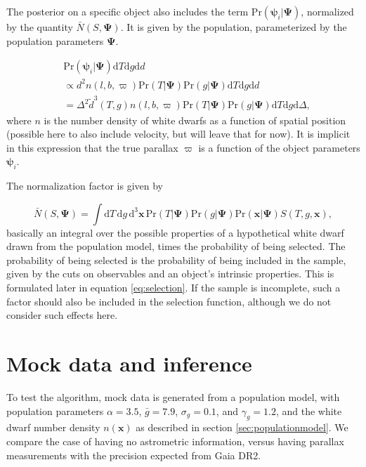 \documentclass[fleqn,usenatbib]{mnras}
\newcommand{\popp}{\boldsymbol{\Psi}}
\newcommand{\objp}{\boldsymbol{\psi}}
\newcommand{\Teff}{T}
\newcommand{\logg}{g}
\newcommand{\pr}{\text{Pr}}
\newcommand{\de}{\text{d}}
\begin{document}
The posterior on a specific object also includes the term $\pr(\objp_i | \popp)$, normalized by the quantity $\bar{N}(S,\popp)$. It is given by the population, parameterized by the population parameters $\popp$.

\begin{equation}
\begin{split}
	& \pr(\objp_i | \popp) \de \Teff \de \logg \de d  \\ & \propto
    d^2 n(l,b,\varpi) \pr(\Teff | \popp) \pr(g | \popp) \de \Teff \de \logg \de d \\
    & = \Delta^2\tilde{d}^3(\Teff,\logg) n(l,b,\varpi) \pr(\Teff | \popp) \pr(g | \popp) \de \Teff \de \logg \de \Delta,
\end{split}
\end{equation}
where $n$ is the number density of white dwarfs as a function of spatial position (possible here to also include velocity, but will leave that for now). It is implicit in this expression that the true parallax $\varpi$ is a function of the object parameters $\objp_i$.

The normalization factor is given by

\begin{equation}\label{eq:normalization}
	\bar{N}(S,\popp) = \int \de\Teff\, \de \logg\, \de^3\mathbf{x}\,
    \pr(\Teff | \popp) \pr(\logg | \popp) \pr(\mathbf{x} | \popp) S(\Teff,\logg,\mathbf{x}),
\end{equation}
basically an integral over the possible properties of a hypothetical white dwarf drawn from the population model, times the probability of being selected. The probability of being selected is the probability of being included in the sample, given by the cuts on observables and an object's intrinsic properties. This is formulated later in equation \eqref{eq:selection}. If the sample is incomplete, such a factor should also be included in the selection function, although we do not consider such effects here.



\section{Mock data and inference}\label{sec:mock}

To test the algorithm, mock data is generated from a population model, with population parameters $\alpha=3.5$, $\bar{g}=7.9$, $\sigma_g=0.1$, and $\gamma_g=1.2$, and the white dwarf number density $n(\mathbf{x})$ as described in section \ref{sec:populationmodel}. We compare the case of having no astrometric information, versus having parallax measurements with the precision expected from Gaia DR2.
\end{document}
